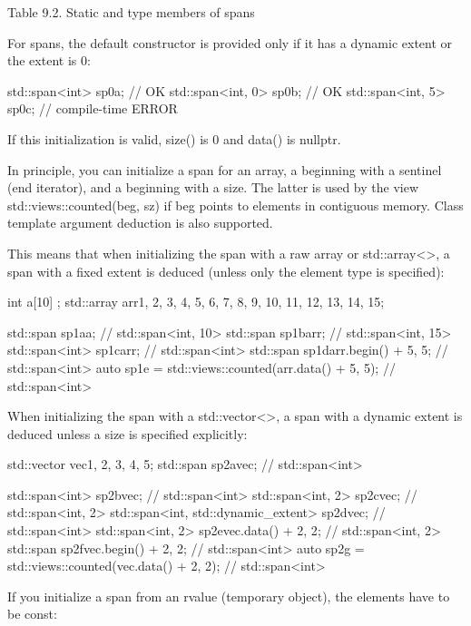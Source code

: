 \begin{center}
Table 9.2. Static and type members of spans
\end{center}


For spans, the default constructor is provided only if it has a dynamic extent or the extent is 0:

\begin{cpp}
std::span<int> sp0a; // OK
std::span<int, 0> sp0b; // OK
std::span<int, 5> sp0c; // compile-time ERROR
\end{cpp}

If this initialization is valid, size() is 0 and data() is nullptr.

In principle, you can initialize a span for an array, a beginning with a sentinel (end iterator), and a beginning with a size. The latter is used by the view std::views::counted(beg, sz) if beg points to elements in contiguous memory. Class template argument deduction is also supported.

This means that when initializing the span with a raw array or std::array<>, a span with a fixed extent is deduced (unless only the element type is specified):

\begin{cpp}
int a[10] {};
std::array arr{1, 2, 3, 4, 5, 6, 7, 8, 9, 10, 11, 12, 13, 14, 15};

std::span sp1a{a}; // std::span<int, 10>
std::span sp1b{arr}; // std::span<int, 15>
std::span<int> sp1c{arr}; // std::span<int>
std::span sp1d{arr.begin() + 5, 5}; // std::span<int>
auto sp1e = std::views::counted(arr.data() + 5, 5); // std::span<int>
\end{cpp}

When initializing the span with a std::vector<>, a span with a dynamic extent is deduced unless a size is specified explicitly:

\begin{cpp}
std::vector vec{1, 2, 3, 4, 5};
std::span sp2a{vec}; // std::span<int>

std::span<int> sp2b{vec}; // std::span<int>
std::span<int, 2> sp2c{vec}; // std::span<int, 2>
std::span<int, std::dynamic_extent> sp2d{vec}; // std::span<int>
std::span<int, 2> sp2e{vec.data() + 2, 2}; // std::span<int, 2>
std::span sp2f{vec.begin() + 2, 2}; // std::span<int>
auto sp2g = std::views::counted(vec.data() + 2, 2); // std::span<int>
\end{cpp}

If you initialize a span from an rvalue (temporary object), the elements have to be const:

